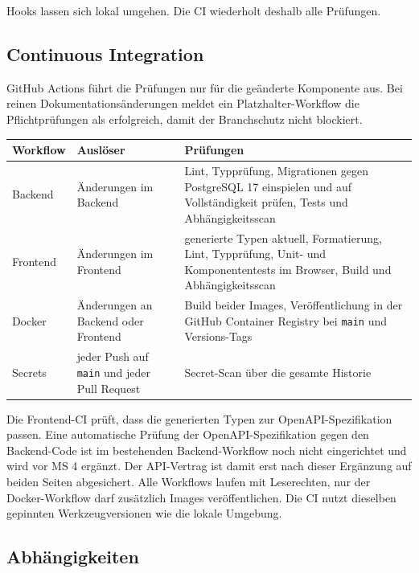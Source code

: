 \documentclass[11pt,a4paper]{article}
\begin{document}
Hooks lassen sich lokal umgehen. Die CI wiederholt deshalb alle Prüfungen.

\subsection{Continuous Integration}

GitHub Actions führt die Prüfungen nur für die geänderte Komponente aus. Bei reinen Dokumentationsänderungen meldet ein Platzhalter-Workflow die Pflichtprüfungen als erfolgreich, damit der Branchschutz nicht blockiert.

\begin{tabularx}{\linewidth}{@{}l >{\hsize=0.73\hsize\RaggedRight\arraybackslash}X >{\hsize=1.27\hsize\RaggedRight\arraybackslash}X@{}}
\toprule
\textbf{Workflow} & \textbf{Auslöser} & \textbf{Prüfungen} \\
\midrule
\endhead
Backend & Änderungen im Backend & Lint, Typprüfung, Migrationen gegen PostgreSQL 17 einspielen und auf Vollständigkeit prüfen, Tests und Abhängigkeitsscan \\
Frontend & Änderungen im Frontend & generierte Typen aktuell, Formatierung, Lint, Typprüfung, Unit- und Komponententests im Browser, Build und Abhängigkeitsscan \\
Docker & Änderungen an Backend oder Frontend & Build beider Images, Veröffentlichung in der GitHub Container Registry bei \texttt{main} und Versions-Tags \\
Secrets & jeder Push auf \texttt{main} und jeder Pull Request & Secret-Scan über die gesamte Historie \\
\bottomrule
\end{tabularx}

Die Frontend-CI prüft, dass die generierten Typen zur OpenAPI-Spezifikation passen. Eine automatische Prüfung der OpenAPI-Spezifikation gegen den Backend-Code ist im bestehenden Backend-Workflow noch nicht eingerichtet und wird vor MS 4 ergänzt. Der API-Vertrag ist damit erst nach dieser Ergänzung auf beiden Seiten abgesichert. Alle Workflows laufen mit Leserechten, nur der Docker-Workflow darf zusätzlich Images veröffentlichen. Die CI nutzt dieselben gepinnten Werkzeugversionen wie die lokale Umgebung.

\subsection{Abhängigkeiten}
\end{document}
